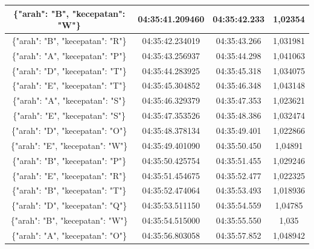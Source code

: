 \begin{longtable}{|ccc|c|}
  \multicolumn{1}{|c|}{\{"arah": "B", "kecepatan": "W"\}} & \multicolumn{1}{c|}{04:35:41.209460} & 04:35:42.233       & 1,02354     \\ \hline
  \multicolumn{1}{|c|}{\{"arah": "B", "kecepatan": "R"\}} & \multicolumn{1}{c|}{04:35:42.234019} & 04:35:43.266       & 1,031981    \\ \hline
  \multicolumn{1}{|c|}{\{"arah": "A", "kecepatan": "P"\}} & \multicolumn{1}{c|}{04:35:43.256937} & 04:35:44.298       & 1,041063    \\ \hline
  \multicolumn{1}{|c|}{\{"arah": "D", "kecepatan": "T"\}} & \multicolumn{1}{c|}{04:35:44.283925} & 04:35:45.318       & 1,034075    \\ \hline
  \multicolumn{1}{|c|}{\{"arah": "E", "kecepatan": "T"\}} & \multicolumn{1}{c|}{04:35:45.304852} & 04:35:46.348       & 1,043148    \\ \hline
  \multicolumn{1}{|c|}{\{"arah": "A", "kecepatan": "S"\}} & \multicolumn{1}{c|}{04:35:46.329379} & 04:35:47.353       & 1,023621    \\ \hline
  \multicolumn{1}{|c|}{\{"arah": "E", "kecepatan": "S"\}} & \multicolumn{1}{c|}{04:35:47.353526} & 04:35:48.386       & 1,032474    \\ \hline
  \multicolumn{1}{|c|}{\{"arah": "D", "kecepatan": "O"\}} & \multicolumn{1}{c|}{04:35:48.378134} & 04:35:49.401       & 1,022866    \\ \hline
  \multicolumn{1}{|c|}{\{"arah": "E", "kecepatan": "W"\}} & \multicolumn{1}{c|}{04:35:49.401090} & 04:35:50.450       & 1,04891     \\ \hline
  \multicolumn{1}{|c|}{\{"arah": "B", "kecepatan": "P"\}} & \multicolumn{1}{c|}{04:35:50.425754} & 04:35:51.455       & 1,029246    \\ \hline
  \multicolumn{1}{|c|}{\{"arah": "E", "kecepatan": "R"\}} & \multicolumn{1}{c|}{04:35:51.454675} & 04:35:52.477       & 1,022325    \\ \hline
  \multicolumn{1}{|c|}{\{"arah": "B", "kecepatan": "T"\}} & \multicolumn{1}{c|}{04:35:52.474064} & 04:35:53.493       & 1,018936    \\ \hline
  \multicolumn{1}{|c|}{\{"arah": "D", "kecepatan": "Q"\}} & \multicolumn{1}{c|}{04:35:53.511150} & 04:35:54.559       & 1,04785     \\ \hline
  \multicolumn{1}{|c|}{\{"arah": "B", "kecepatan": "W"\}} & \multicolumn{1}{c|}{04:35:54.515000} & 04:35:55.550       & 1,035       \\ \hline
  \multicolumn{1}{|c|}{\{"arah": "A", "kecepatan": "O"\}} & \multicolumn{1}{c|}{04:35:56.803058} & 04:35:57.852       & 1,048942    \\ \hline

\end{longtable}
